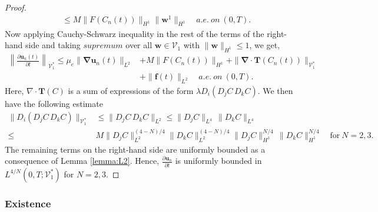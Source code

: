 \documentclass[final,3p,times]{elsarticle}
\theoremstyle{plain}
\theoremstyle{remark}
\newcommand{\lV}{\lVert}
\newcommand{\rV}{\rVert}
\theoremstyle{plain}
\theoremstyle{remark}
\begin{document}
\begin{proof}
\begin{align}
     &\leq M \lVert {F \left( C_n \left( t \right) \right)} \rVert_{H^1} \lVert \mathbf w^1 \rVert_{H^1} \quad a.e. \ on \ \left( 0, T \right). \label{eq: estimate of F(C_n)} 
\end{align}
Now applying Cauchy-Schwarz inequality in the rest of the terms of the right-hand side and taking $supremum$ over all $\mathbf w \in \mathscr V_1$ with $\|\mathbf w\|_{H^1} \le1$, we get,
\begin{align}
     \left \lVert \frac{\partial \mathbf{u}_n\left(t\right)}{\partial t} \right\rVert_{\mathscr V_1^*} \le \mu_e\|\boldsymbol{\nabla} \mathbf{u}_n\left(t\right)\|_{L^2} 
     & + M\|{ F\left(C_n\left(t\right)\right)}\|_{H^1} + \| \boldsymbol{\nabla} \cdot \mathbf{T}\left(C_n\left(t\right)\right) \|_{\mathscr V_1^*} \nonumber \\
     & + \| \mathbf f\left(t\right)\|_{L^2}  \quad  a.e. \ on \ \left(0,T\right)\label{eq: L51}. 
\end{align}
Here, $\nabla \cdot \mathbf{T}(C)$ is a sum of expressions of the form $\lambda D_i(D_j C \, D_k C)$. We then have the following estimate
\begin{align}\label{est: korteweg stress}
\| D_i(D_j C \, D_k C) \|_{\mathscr  V_1^*} & \leq \| D_j C \, D_k C \|_{L^2} \leq \| D_j C \|_{L^4} \, \| D_k C \|_{L^4}  \nonumber\\
\leq & M  \lV D_j C\rV^{(4-N)/4}_{L^2}  \lV D_k C\rV^{(4-N)/4}_{L^2} \| D_j C \|_{H^1}^{N/4} \, \| D_k C \|_{H^1}^{N/4} \quad\text{for}\ N = 2,3 .
\end{align}
The remaining terms on the right-hand side are uniformly bounded as a consequence of Lemma \ref{lemma:L2}.  Hence, $ \displaystyle \frac{\partial \mathbf u_n}{\partial t}$ is uniformly bounded in $L^{4/N}\left(0,T;\mathscr V_1^*\right)$ for $N=2,3$.
\end{proof}

\subsubsection{Existence}
\end{document}
